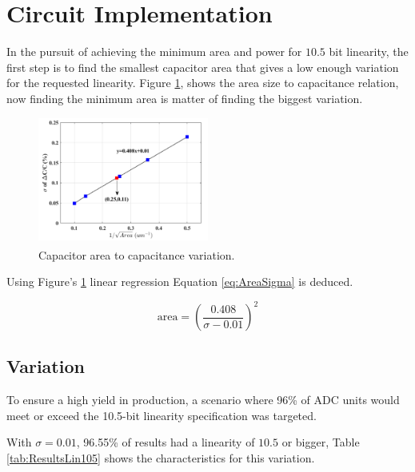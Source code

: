 \section{Circuit Implementation}
\label{sec:implementation}

In the pursuit of achieving the minimum area and power for $10.5$ bit linearity, the first step is to find the smallest capacitor area that gives a low enough variation for the requested linearity. Figure \ref{fig:Csize2sigma}, shows the area size to capacitance relation, now finding the minimum area is matter of finding the biggest variation. 

\begin{figure}[H]

    \centering
    \includegraphics*[width=0.5\textwidth]{Images/Csize2sigma.png}
    \caption{Capacitor area to capacitance variation.\textsuperscript{\cite{paper}}}

    \label{fig:Csize2sigma}
\end{figure}

Using Figure's \ref{fig:Csize2sigma} linear regression Equation \ref{eq:AreaSigma} is deduced.

\begin{equation}
    \text{area} = \left(\frac{0.408}{\sigma - 0.01}\right)^2
    \label{eq:AreaSigma}
\end{equation}

\subsection{Variation}

To ensure a high yield in production, a scenario where 96\% of ADC units would meet or exceed the 10.5-bit linearity specification was targeted. 

With $\sigma = 0.01$, 96.55\% of results had a linearity of $10.5$ or bigger, Table \ref{tab:ResultsLin105} shows the characteristics for this variation.

